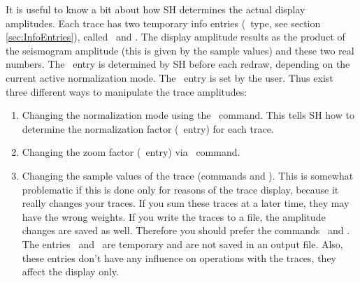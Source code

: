 It is useful to know a bit about how SH determines the actual
display amplitudes.  Each trace has two temporary info entries
(\ type, see section \ref{sec:InfoEntries}), called
\ and .  The display amplitude results as
the product of the seismogram amplitude (this is given by the
sample values) and these two real numbers.  The \ entry is
determined by SH before each redraw, depending on the current
active normalization mode.  The \ entry is set by the
user.  Thus exist three different ways to manipulate the trace
amplitudes:
\begin{enumerate}
\item
   Changing the normalization mode using the \ command.
   This tells SH how to determine the normalization factor
   (\ entry) for each trace.
\item
   Changing the zoom factor (\ entry) via \
   command.
\item
   Changing the sample values of the trace (commands  and
   \cmd{unit}).  This is somewhat problematic if this is done only
   for reasons of the trace display, because it really changes your
   traces.  If you sum these traces at a later time, they may have
   the wrong weights.  If you write the traces to a file, the
   amplitude changes are saved as well.  Therefore you should prefer
   the commands \cmd{norm}\ and \cmd{zoom}.  The entries \shi{norm}\
   and \ are temporary and are not saved in an output file.
   Also, these entries don't have any influence on operations with
   the traces, they affect the display only.
\end{enumerate}

